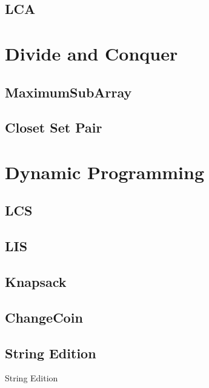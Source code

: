 \subsection{LCA}

\section{Divide and Conquer}

\subsection{MaximumSubArray}


\subsection{Closet Set Pair}

\section{Dynamic Programming}

\subsection{LCS}


\subsection{LIS}


\subsection{Knapsack}


\subsection{ChangeCoin}


\subsection{String Edition}

String Edition
